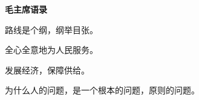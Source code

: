 \sffamily

\begin{center}
\huge
{%
	\bfseries
	毛主席语录
}
\end{center}

\Large
\doublespacing
\setlength{\parindent}{2em}

路线是个纲，纲举目张。

全心全意地为人民服务。

发展经济，保障供给。

为什么人的问题，是一个根本的问题，原则的问题。

